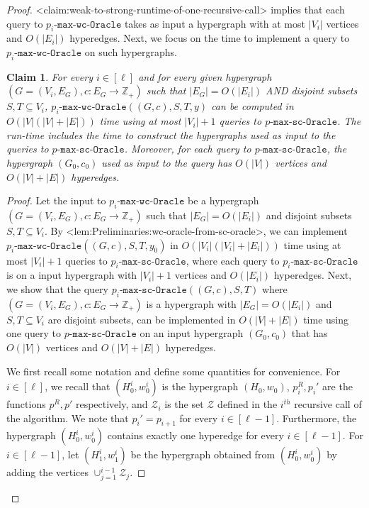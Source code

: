 \documentclass{article}
\def\Cref#1{<#1>}%
\newtheorem{claim}{Claim}[section]
\newcommand{\zeros}{\ensuremath{\mathcal{Z}}\xspace}
\newcommand{\functionMaximizationOracle}[1]{\ensuremath{{#1}\text{-}\mathtt{max}\text{-}\mathtt{wc}\text{-}\mathtt{Oracle}}\xspace}
\newcommand{\functionMaximizationOracleStrongCover}[1]{\ensuremath{{#1}\text{-}\mathtt{max}\text{-}\mathtt{sc}\text{-}\mathtt{Oracle}}\xspace}
\providecommand{\Z}{\mathbb{Z}}
\begin{document}
\begin{proof}
\Cref{claim:weak-to-strong-runtime-of-one-recursive-call} implies that each query to \functionMaximizationOracle{p_i} takes as input a hypergraph 
with at most $|V_i|$ vertices and $O(|E_i|)$ hyperedges.  
Next, we focus on the time to implement a query to \functionMaximizationOracle{p_i} on such hypergraphs. 

\begin{claim}\label{claim:WeakToStrong:p_i-oracle-using-p-oracle}
For every $i\in [\ell]$ and for every given hypergraph $(G = (V_i, E_G), c:E_G\rightarrow\Z_+)$ such that $|E_G| = O(|E_i|)$ AND disjoint subsets $S, T\subseteq V_i$, $\functionMaximizationOracle{p_i}((G, c), S, T, y)$ can be computed in $O(|V|(|V| + |E|))$ time using at most $|V_i|+1$ queries to \functionMaximizationOracleStrongCover{p}. The run-time includes the time to construct the hypergraphs used as input to the queries to \functionMaximizationOracleStrongCover{p}. Moreover, for each query to \functionMaximizationOracleStrongCover{p}, the hypergraph $(G_0, c_0)$ used as input to the query has $O(|V|)$ vertices and $O(|V|+|E|)$ hyperedges.
\end{claim}
\begin{proof}
Let the input to \functionMaximizationOracle{p_i} be a hypergraph $(G = (V_i, E_G), c:E_G\rightarrow\Z_+)$ such that $|E_G| = O(|E_i|)$ and disjoint subsets $S, T\subseteq V_i$. By \Cref{lem:Preliminaries:wc-oracle-from-sc-oracle}, we can implement $\functionMaximizationOracle{p_i}((G, c), S, T, y_0)$ in $O(|V_i|(|V_i| + |E_i|))$ time using at most $|V_i|+1$ queries to $\functionMaximizationOracleStrongCover{p_i}$, where each query to $\functionMaximizationOracleStrongCover{p_i}$ is on a input hypergraph with $|V_i|+1$ vertices and $O(|E_i|)$ hyperedges. Next, we show that the query $\functionMaximizationOracleStrongCover{p_i}((G, c), S, T)$ where $(G = (V_i, E_G), c:E_G\rightarrow\Z_+)$ is a hypergraph with $|E_G| = O(|E_i|)$ and $S, T\subseteq V_i$ are disjoint subsets, can be implemented in $O(|V| + |E|)$ time using one query to  $\functionMaximizationOracleStrongCover{p}$ on an input hypergraph $(G_0, c_0)$ that has $O(|V|)$ vertices and $O(|V|+|E|)$ hyperedges. 

We first recall some notation and define some quantities for convenience. For $i\in [\ell]$, we recall that $(H_0^i, w_0^i)$ is the hypergraph $(H_0, w_0)$, $p^R_i, p_i'$ are the functions $p^R, p'$ respectively, and $\zeros_i$ is the set $\zeros$ defined in the $i^{th}$ recursive call of the algorithm. We note that $p_i' =p_{i+1}$ for every $i\in [\ell-1]$. Furthermore, the hypergraph $(H_0^i, w_0^i)$ contains exactly one hyperedge for every $i\in [\ell-1]$. 
For $i\in [\ell-1]$, let $(H_1^i, w_1^i)$ be the hypergraph obtained from $(H_0^i, w_0^i)$ by adding the vertices $\cup_{j=1}^{i-1}\zeros_{j}$.


\end{proof}
\end{proof}
\end{document}
